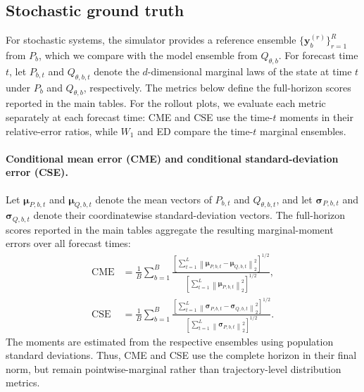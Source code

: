 \subsection{Stochastic ground truth}

For stochastic systems, the simulator provides a reference ensemble
$\{\mathbf y_b^{(r)}\}_{r=1}^{R}$ from $P_b$, which we compare with the model
ensemble from $Q_{\theta,b}$. For forecast time
$t$, let $P_{b,t}$ and $Q_{\theta,b,t}$ denote the $d$-dimensional marginal
laws of the state at time $t$ under $P_b$ and $Q_{\theta,b}$, respectively. The metrics below define the full-horizon
scores reported in the main tables. For the rollout plots, we evaluate each
metric separately at each forecast time: CME and CSE use the time-$t$ moments
in their relative-error ratios, while $W_1$ and ED compare the time-$t$
marginal ensembles.

\paragraph{Conditional mean error (CME) and
conditional standard-deviation error (CSE).}
Let $\boldsymbol{\mu}_{P,b,t}$ and $\boldsymbol{\mu}_{Q,b,t}$ denote the mean
vectors of $P_{b,t}$ and $Q_{\theta,b,t}$, and let
$\boldsymbol{\sigma}_{P,b,t}$ and $\boldsymbol{\sigma}_{Q,b,t}$ denote their
coordinatewise standard-deviation vectors. The full-horizon scores reported in the main tables aggregate
the resulting marginal-moment errors over all forecast times:
\begin{equation}
  \begin{aligned}
    \operatorname{CME}
    &=
    \frac{1}{B}\sum_{b=1}^{B}
    \frac{
      \left[
        \sum_{t=1}^{L}
        \left\|\boldsymbol{\mu}_{P,b,t}-\boldsymbol{\mu}_{Q,b,t}\right\|_2^2
      \right]^{1/2}
    }{
      \left[
        \sum_{t=1}^{L}\left\|\boldsymbol{\mu}_{P,b,t}\right\|_2^2
      \right]^{1/2}
    },
    \\
    \operatorname{CSE}
    &=
    \frac{1}{B}\sum_{b=1}^{B}
    \frac{
      \left[
        \sum_{t=1}^{L}
        \left\|\boldsymbol{\sigma}_{P,b,t}-\boldsymbol{\sigma}_{Q,b,t}\right\|_2^2
      \right]^{1/2}
    }{
      \left[
        \sum_{t=1}^{L}\left\|\boldsymbol{\sigma}_{P,b,t}\right\|_2^2
      \right]^{1/2}
    }.
  \end{aligned}
  \label{eq:cme-cse}
\end{equation}
The moments are estimated from the respective ensembles using population
standard deviations. Thus, CME and CSE use the complete horizon in their
final norm, but remain pointwise-marginal rather than trajectory-level
distribution metrics.

